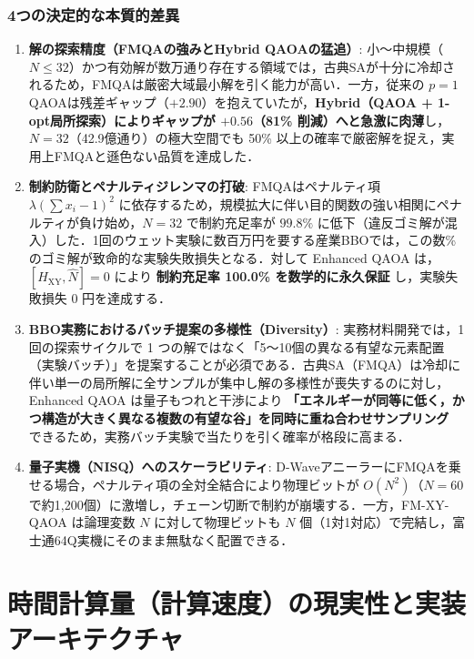 \documentclass[11pt,a4paper]{ltjsarticle}
\begin{document}
\subsubsection{4つの決定的な本質的差異}
\begin{enumerate}\setlength{\itemsep}{1.5pt}
    \item \textbf{解の探索精度（FMQAの強みとHybrid QAOAの猛追）}: 小〜中規模（$N \le 32$）かつ有効解が数万通り存在する領域では，古典SAが十分に冷却されるため，FMQAは厳密大域最小解を引く能力が高い．一方，従来の $p=1$ QAOAは残差ギャップ（$+2.90$）を抱えていたが，\textbf{Hybrid（QAOA + 1-opt局所探索）によりギャップが $+0.56$（81\% 削減）へと急激に肉薄}し，$N=32$（42.9億通り）の極大空間でも 50\% 以上の確率で厳密解を捉え，実用上FMQAと遜色ない品質を達成した．
    \item \textbf{制約防衛とペナルティジレンマの打破}: FMQAはペナルティ項 $\lambda (\sum x_i - 1)^2$ に依存するため，規模拡大に伴い目的関数の強い相関にペナルティが負け始め，$N=32$ で制約充足率が $99.8\%$ に低下（違反ゴミ解が混入）した．1回のウェット実験に数百万円を要する産業BBOでは，この数\%のゴミ解が致命的な実験失敗損失となる．対して Enhanced QAOA は，$[H_{\mathrm{XY}}, \hat{N}]=0$ により \textbf{制約充足率 100.0\% を数学的に永久保証} し，実験失敗損失 0 円を達成する．
    \item \textbf{BBO実務におけるバッチ提案の多様性（Diversity）}: 実務材料開発では，1回の探索サイクルで 1 つの解ではなく「5〜10個の異なる有望な元素配置（実験バッチ）」を提案することが必須である．古典SA（FMQA）は冷却に伴い単一の局所解に全サンプルが集中し解の多様性が喪失するのに対し，Enhanced QAOA は量子もつれと干渉により \textbf{「エネルギーが同等に低く，かつ構造が大きく異なる複数の有望な谷」を同時に重ね合わせサンプリング} できるため，実務バッチ実験で当たりを引く確率が格段に高まる．
    \item \textbf{量子実機（NISQ）へのスケーラビリティ}: D-WaveアニーラーにFMQAを乗せる場合，ペナルティ項の全対全結合により物理ビットが $O(N^2)$（$N=60$ で約1,200個）に激増し，チェーン切断で制約が崩壊する．一方，FM-XY-QAOA は論理変数 $N$ に対して物理ビットも $N$ 個（1対1対応）で完結し，富士通64Q実機にそのまま無駄なく配置できる．
\end{enumerate}

\vspace{3mm}

\section{時間計算量（計算速度）の現実性と実装アーキテクチャ}
\label{sec:time_complexity}
\vspace{-1mm}
\end{document}

